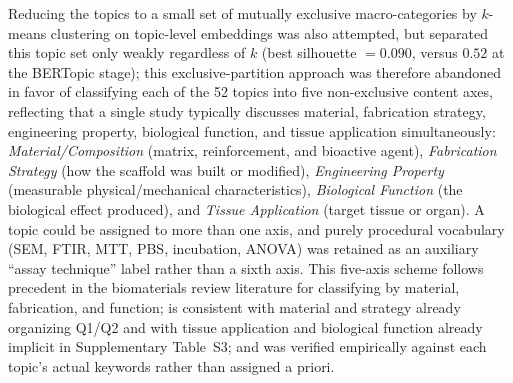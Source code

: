 \documentclass[5p,times,twocolumn]{elsarticle}
\begin{document}
Reducing the topics to a small set of mutually exclusive macro-categories by $k$-means clustering on topic-level embeddings was also attempted, but separated this topic set only weakly regardless of $k$ (best silhouette $=0.090$, versus $0.52$ at the BERTopic stage); this exclusive-partition approach was therefore abandoned in favor of classifying each of the 52 topics into five non-exclusive content axes, reflecting that a single study typically discusses material, fabrication strategy, engineering property, biological function, and tissue application simultaneously: \emph{Material/Composition} (matrix, reinforcement, and bioactive agent), \emph{Fabrication Strategy} (how the scaffold was built or modified), \emph{Engineering Property} (measurable physical/mechanical characteristics), \emph{Biological Function} (the biological effect produced), and \emph{Tissue Application} (target tissue or organ). A topic could be assigned to more than one axis, and purely procedural vocabulary (SEM, FTIR, MTT, PBS, incubation, ANOVA) was retained as an auxiliary ``assay technique'' label rather than a sixth axis. This five-axis scheme follows precedent in the biomaterials review literature for classifying by material, fabrication, and function; is consistent with material and strategy already organizing Q1/Q2 and with tissue application and biological function already implicit in Supplementary Table~S3; and was verified empirically against each topic's actual keywords rather than assigned a priori.
\end{document}
